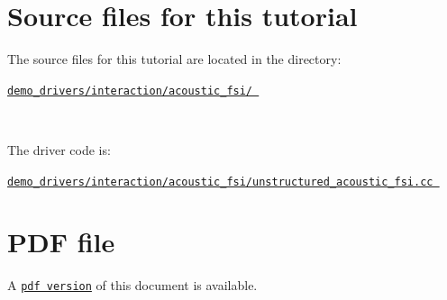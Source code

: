 \begin{DoxyCodeInclude}
{{{{{{{{{   
  \}
 
\} \textcolor{comment}{//end of main}








\end{DoxyCodeInclude}




 

\hypertarget{index_sources}{}\section{Source files for this tutorial}\label{index_sources}

\begin{DoxyItemize}
\item The source files for this tutorial are located in the directory\+:~\newline
~\newline
 \begin{center} \href{../../../../demo_drivers/interaction/acoustic_fsi}{\tt demo\+\_\+drivers/interaction/acoustic\+\_\+fsi/ } \end{center} ~\newline

\item The driver code is\+: ~\newline
~\newline
 \begin{center} \href{../../../../demo_drivers/interaction/acoustic_fsi/unstructured_acoustic_fsi.cc}{\tt demo\+\_\+drivers/interaction/acoustic\+\_\+fsi/unstructured\+\_\+acoustic\+\_\+fsi.\+cc } \end{center} 
\end{DoxyItemize}



 

 \hypertarget{index_pdf}{}\section{P\+D\+F file}\label{index_pdf}
A \href{../latex/refman.pdf}{\tt pdf version} of this document is available. 
